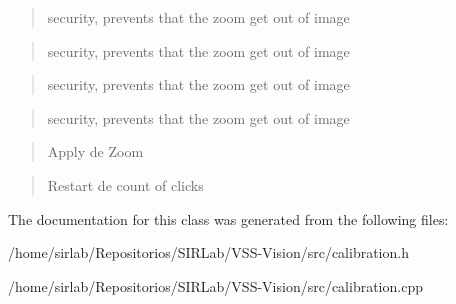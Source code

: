 \begin{quotation}
security, prevents that the zoom get out of image \end{quotation}


\begin{quotation}
security, prevents that the zoom get out of image \end{quotation}


\begin{quotation}
security, prevents that the zoom get out of image \end{quotation}


\begin{quotation}
security, prevents that the zoom get out of image \end{quotation}


\begin{quotation}
Apply de Zoom \end{quotation}


\begin{quotation}
Restart de count of clicks \end{quotation}


The documentation for this class was generated from the following files\-:\begin{DoxyCompactItemize}
\item 
/home/sirlab/\-Repositorios/\-S\-I\-R\-Lab/\-V\-S\-S-\/\-Vision/src/calibration.\-h\item 
/home/sirlab/\-Repositorios/\-S\-I\-R\-Lab/\-V\-S\-S-\/\-Vision/src/calibration.\-cpp\end{DoxyCompactItemize}
